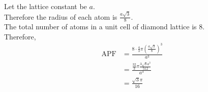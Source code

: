\documentclass[fleqn, a4paper, 11pt, oneside]{amsart}
\theoremstyle{definition}
\theoremstyle{theorem}
\begin{document}
\begin{solution}
\begin{enumerate}[leftmargin=*]
			Let the lattice constant be $a$.\\
			Therefore the radius of each atom is $\frac{a \sqrt{3}}{8}$.\\
			The total number of atoms in a unit cell of diamond lattice is $8$.\\
			Therefore,
			\begin{align*}
				\text{APF} & = \frac{8 \cdot \frac{4}{3} \pi \left( \frac{a \sqrt{3}}{8} \right)^3}{a^3} \\
                                           & = \frac{\frac{32}{3} \pi \frac{3 \sqrt{3} a^3}{512}}{a^3}                   \\
                                           & = \frac{\sqrt{3} \pi}{16}
			\end{align*}
	\end{enumerate}
\end{solution}
\end{document}
